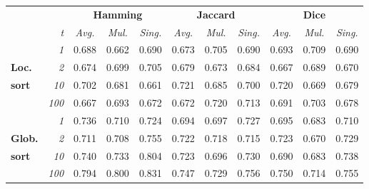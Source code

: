 \begin{small}
\begin{tabularx}{0.98\textwidth}{X r  c c c  c c c  c c c}
\hline
\multicolumn{2}{r}{} & \multicolumn{3}{c}{\textbf{Hamming}} & \multicolumn{3}{c}{\textbf{Jaccard}} & \multicolumn{3}{c}{\textbf{Dice}} \\
& \textit{t} & \textit{Avg.} & \textit{Mul.} & \textit{Sing.} & \textit{Avg.} & \textit{Mul.} & \textit{Sing.} & \textit{Avg.} & \textit{Mul.} & \textit{Sing.} \\ 
\hline
 				& \textit{1} & 0.688 & 0.662 & 0.690 & 0.673 & 0.705 & 0.690 & 0.693 & 0.709 & 0.690 \\
\textbf{Loc.}	& \textit{2} & 0.674 & 0.699 & 0.705 & 0.679 & 0.673 & 0.684 & 0.667 & 0.689 & 0.670 \\
\textbf{sort}	& \textit{10} & 0.702 & 0.681 & 0.661 & 0.721 & 0.685 & 0.700 & 0.720 & 0.669 & 0.679 \\
				& \textit{100} & 0.667 & 0.693 & 0.672 & 0.672 & 0.720 & 0.713 & 0.691 & 0.703 & 0.678 \\
 				& \textit{1} & 0.736 & 0.710 & 0.724 & 0.694 & 0.697 & 0.727 & 0.695 & 0.683 & 0.710 \\
\textbf{Glob.}	& \textit{2} & 0.711 & 0.708 & 0.755 & 0.722 & 0.718 & 0.715 & 0.723 & 0.670 & 0.729 \\
\textbf{sort}	& \textit{10} & 0.740 & 0.733 & 0.804 & 0.723 & 0.696 & 0.730 & 0.690 & 0.683 & 0.738 \\
				& \textit{100} & 0.794 & 0.800 & 0.831 & 0.747 & 0.729 & 0.756 & 0.750 & 0.714 & 0.755 \\
\hline
\end{tabularx}


\end{small}
